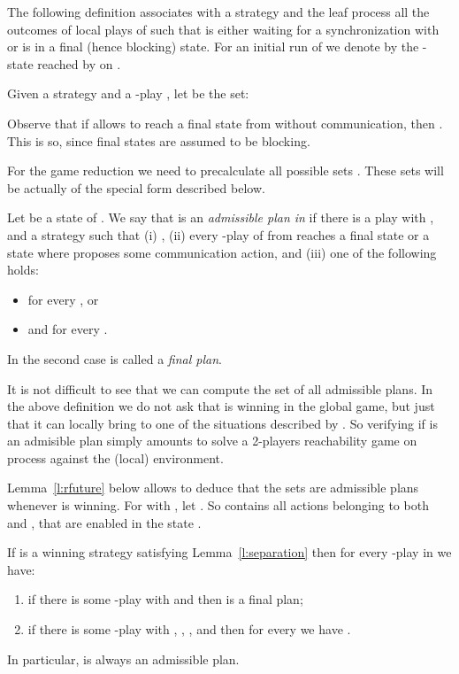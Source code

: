 \documentclass{llncs}
\begin{document}
The following definition associates with a strategy  and the leaf
process  all the outcomes of local plays of  such that  is
either waiting for a synchronization with  or is in a final (hence
blocking) state.  For an initial run  of  we denote by
 the -state reached by  on .


 \begin{definition}\label{d:outcome}
Given a strategy  and a
-play , let  be the set:
   
 \end{definition}
Observe that if  allows  to reach a final state  from 
without communication, then . This is so,
since final states are assumed to be blocking.



For the game reduction we need to precalculate all possible sets
. These sets will be actually of the special form
described below. 


\begin{definition}
  Let  be a state of .  We say that  is an \emph{admissible plan in } if
  there is a play  with , and a strategy  such
  that (i) , (ii) every -play of  from 
  reaches a final state or a state where  proposes some communication
  action, and (iii) one of the following holds:
  \begin{itemize}
  \item  for every , or
    \item  and  for every .
  \end{itemize}
  In the second case  is called a \emph{final plan}.
\end{definition}


It is not difficult to see that we can compute the set of all
admissible plans. In the above definition we do not ask that  is
winning in the global game, but just that it can locally bring  to one
of the situations described by . So verifying if  is an
admisible plan simply amounts  to solve a 2-players reachability game on process
 against the (local) environment.

Lemma~\ref{l:rfuture} below allows to deduce that the sets 
are admissible plans whenever  is winning. For  with ,  let . So  contains all actions belonging to both  and ,
that are enabled in the state .



\begin{lemma}\label{l:rfuture}
  If  is a winning strategy 
  satisfying Lemma~\ref{l:separation} then for every -play  in  we have:
  \begin{enumerate}
  \item if there is some -play  with  and
      then  is a final plan;
  \item if there is some -play  with , , , and
     then for every  we have
    .
  \end{enumerate}
 In particular,   is always an admissible plan.
\end{lemma}
\end{document}
